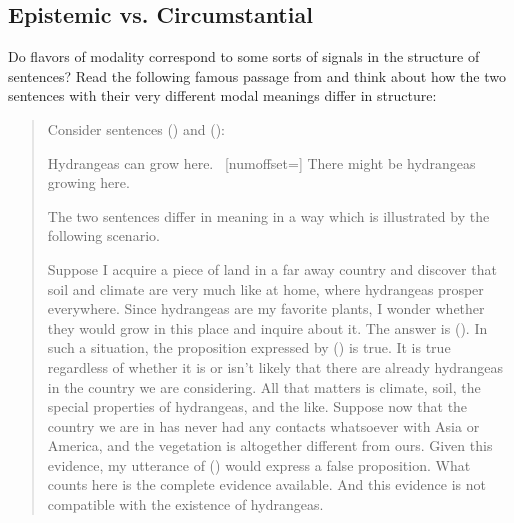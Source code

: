 \subsection{Epistemic vs. Circumstantial}

%
Do flavors of modality correspond to some sorts of signals in the structure of
sentences? Read the following famous passage from \cite{kratzer-1991-modality}
and think about how the two sentences with their very different modal meanings
differ in structure:

\begin{quotation}
	
	\noindent Consider sentences (\nextx) and (\anextx):%
  
  \ex[numoffset=\leftmargin] Hydrangeas can grow here. \xe
	\ex~[numoffset=\leftmargin] There might be hydrangeas growing here. \xe
	
	\noindent The two sentences differ in meaning in a way which is illustrated by
  the following scenario.
	
	\medskip Suppose I acquire a piece of land in a far away country and discover
  that soil and climate are very much like at home, where hydrangeas prosper
  everywhere. Since hydrangeas are my favorite plants, I wonder whether they
  would grow in this place and inquire about it. The answer is (\blastx). In
  such a situation, the proposition expressed by (\blastx) is true. It is true
  regardless of whether it is or isn't likely that there are already hydrangeas
  in the country we are considering. All that matters is climate, soil, the
  special properties of hydrangeas, and the like. Suppose now that the country
  we are in has never had any contacts whatsoever with Asia or America, and the
  vegetation is altogether different from ours. Given this evidence, my
  utterance of (\lastx) would express a false proposition. What counts here is
  the complete evidence available. And this evidence is not compatible with the
  existence of hydrangeas.
	

\end{quotation}
